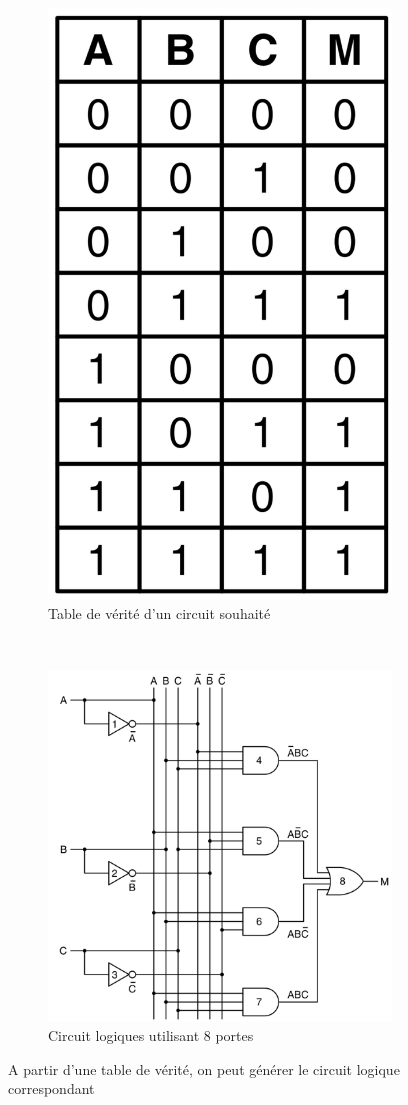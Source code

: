     
    \begin{figure}[htbp]
        \centering
        \begin{subfigure}[b]{0.40\linewidth}\centering
            \includegraphics[width=0.4\linewidth]{images/processeur_porte_table.png}
            \caption{Table de vérité d'un circuit souhaité
            \label{pic:processeur_porte_table}}
        \end{subfigure}
        ~ %
        \begin{subfigure}[b]{0.40\linewidth}\centering
            \includegraphics[width=\linewidth]{images/processeur_porte_schema.png}
            \caption{Circuit logiques  utilisant 8 portes
            \label{pic:processeur_porte_schema}}
        \end{subfigure}
        \caption{A partir d'une table de vérité, on peut générer le circuit logique correspondant \cite{tanenbaum2016structured}  \label{pic:processeur_porte_schema_2}}
    \end{figure}
    

